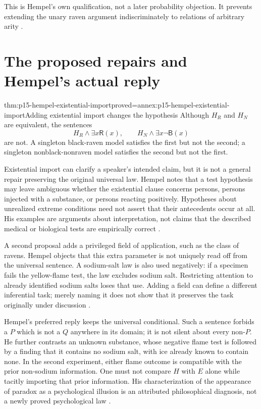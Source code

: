 This is Hempel's own qualification, not a later probability objection.
It prevents extending the unary raven argument indiscriminately to
relations of arbitrary arity
\parencite[I, p.~13, n.~1]{Hempel1945ConfirmationI}.

\section{The proposed repairs and Hempel's actual reply}
\label{sec:p15-hempel-raven-responses}

\begin{hbtheorem}{thm:p15-hempel-existential-import}{proved=annex:p15-hempel-existential-import}{Adding existential import changes the hypothesis}
Although $H_R$ and $H_N$ are equivalent, the sentences
\[
 H_R\land\exists x\mathsf R(x),\qquad
 H_N\land\exists x\neg\mathsf B(x)
\]
are not. A singleton black-raven model satisfies the first but not the
second; a singleton nonblack-nonraven model satisfies the second but not
the first.
\end{hbtheorem}

Existential import can clarify a speaker's intended claim, but it is not
a general repair preserving the original universal law. Hempel notes
that a test hypothesis may leave ambiguous whether the existential clause
concerns persons, persons injected with a substance, or persons reacting
positively. Hypotheses about unrealized extreme conditions need not assert
that their antecedents occur at all. His examples are arguments about
interpretation, not claims that the described medical or biological tests
are empirically correct
\parencite[I, \S5.11, pp.~15--17]{Hempel1945ConfirmationI}.

A second proposal adds a privileged field of application, such as the class
of ravens. Hempel objects that this extra parameter is not uniquely read
off from the universal sentence. A sodium-salt law is also used negatively:
if a specimen fails the yellow-flame test, the law excludes sodium salt.
Restricting attention to already identified sodium salts loses that use.
Adding a field can define a different inferential task; merely naming it
does not show that it preserves the task originally under discussion
\parencite[I, \S5.12, pp.~17--18]{Hempel1945ConfirmationI}.

Hempel's preferred reply keeps the universal conditional. Such a sentence
forbids a $P$ which is not a $Q$ anywhere in its domain; it is not silent
about every non-$P$. He further contrasts an unknown substance, whose
negative flame test is followed by a finding that it contains no sodium
salt, with ice already known to contain none. In the second experiment,
either flame outcome is compatible with the prior non-sodium information.
One must not compare $H$ with $E$ alone while tacitly importing that prior
information. His characterization of the appearance of paradox as a
psychological illusion is an attributed philosophical diagnosis, not a
newly proved psychological law
\parencite[I, \S5.2, pp.~18--21]{Hempel1945ConfirmationI}.

